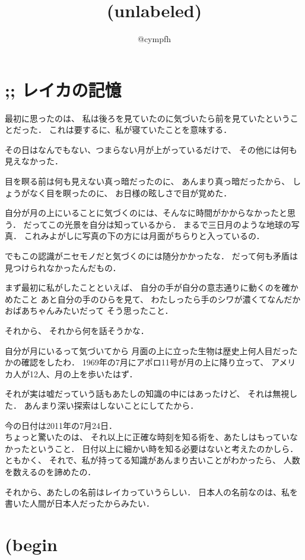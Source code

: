 \documentclass[]{article}
\title{(unlabeled)}
\author{@cympfh}
\begin{document}
\maketitle

\section{;; レイカの記憶}\label{ux30ecux30a4ux30abux306eux8a18ux61b6}

最初に思ったのは、
私は後ろを見ていたのに気づいたら前を見ていたということだった．
これは要するに、私が寝ていたことを意味する．

その日はなんでもない、つまらない月が上がっているだけで、
その他には何も見えなかった．

目を瞑る前は何も見えない真っ暗だったのに、 あんまり真っ暗だったから、
しょうがなく目を瞑ったのに、 お日様の眩しさで目が覚めた．

自分が月の上にいることに気づくのには、そんなに時間がかからなかったと思う．
だってこの光景を自分は知っているから． まるで三日月のような地球の写真．
これみよがしに写真の下の方には月面がちらりと入っているの．

でもこの認識がニセモノだと気づくのには随分かかったな．
だって何も矛盾は見つけられなかったんだもの．

まず最初に私がしたことといえば、
自分の手が自分の意志通りに動くのを確かめたこと
あと自分の手のひらを見て、
わたしったら手のシワが濃くてなんだかおばあちゃんみたいだって
そう思ったこと．

それから、 それから何を話そうかな．

自分が月にいるって気づいてから
月面の上に立った生物は歴史上何人目だったかの確認をしたわ．
1969年の7月にアポロ11号が月の上に降り立って、
アメリカ人が12人、月の上を歩いたはず．

それが実は嘘だっていう話もあたしの知識の中にはあったけど、
それは無視した． あんまり深い探索はしないことにしてたから．

今の日付は2011年の7月24日．\\ちょっと驚いたのは、
それ以上に正確な時刻を知る術を、あたしはもっていなかったということ．
日付以上に細かい時を知る必要はないと考えたのかしら． ともかく、
それで、私が持ってる知識があんまり古いことがわかったら、
人数を数えるのを諦めたの．

それから、あたしの名前はレイカっていうらしい．
日本人の名前なのは、私を書いた人間が日本人だったからみたい．

\section{(begin}\label{begin}
\end{document}
